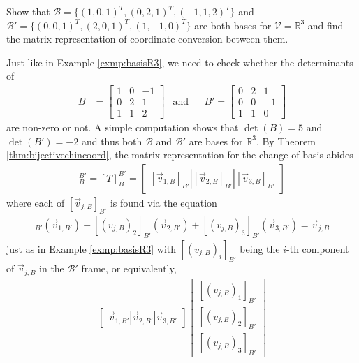 \begin{exmp}
\label{exmp:changecoord}
Show that $\mathcal{B} = \{(1,0,1)^T, (0,2,1)^T, (-1,1,2)^T\}$ and $\mathcal{B}' = \{(0,0,1)^T, (2,0,1)^T, (1,-1,0)^T\}$ are both bases for $\mathcal{V} = \mathbb{R}^3$ and find the matrix representation of coordinate conversion between them.
\end{exmp}
\begin{solution}
Just like in Example \ref{exmp:basisR3}, we need to check whether the determinants of
\begin{align*}
B &= 
\begin{bmatrix}
1 & 0 & -1\\
0 & 2 & 1 \\
1 & 1 & 2
\end{bmatrix}
& \text{and} &
& B' = 
\begin{bmatrix}
0 & 2 & 1 \\
0 & 0 & -1 \\
1 & 1 & 0
\end{bmatrix}
\end{align*}
are non-zero or not. A simple computation shows that $\det(B) = 5$ and $\det(B') = -2$ and thus both $\mathcal{B}$ and $\mathcal{B}'$ are bases for $\mathbb{R}^3$. By Theorem \ref{thm:bijectivechincoord}, the matrix representation for the change of basis abides
\begin{align*}
[\text{id}]_B^{B'} = [T]_B^{B'} = \begin{bmatrix}
[\vec{v}_{1,B}]_{B'} | [\vec{v}_{2,B}]_{B'} | [\vec{v}_{3,B}]_{B'}
\end{bmatrix}
\end{align*}
where each of $[\vec{v}_{j,B}]_{B'}$ is found via the equation
\begin{align*}
[(v_{j,B})_1]_{B'} (\vec{v}_{1,B'}) + [(v_{j,B})_2]_{B'} (\vec{v}_{2,B'}) + [(v_{j,B})_3]_{B'} (\vec{v}_{3,B'}) = \vec{v}_{j,B}
\end{align*}
just as in Example \ref{exmp:basisR3} with $[(v_{j,B})_i]_{B'}$ being the $i$-th component of $\vec{v}_{j,B}$ in the $\mathcal{B}'$ frame, or equivalently,
\begin{align*}
\begin{bmatrix}
\vec{v}_{1,B'} | \vec{v}_{2,B'} | \vec{v}_{3,B'}
\end{bmatrix}
\begin{bmatrix}
[(v_{j,B})_1]_{B'} \\
[(v_{j,B})_2]_{B'} \\
[(v_{j,B})_3]_{B'}
\end{bmatrix}

\end{align*}
\end{solution}
